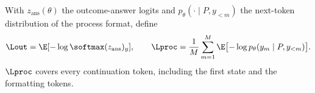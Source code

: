 \begin{definition}\label{def:losses}
With $z_{\mathrm{ans}}(\theta)$ the outcome-answer logits and $p_\theta(\cdot\mid P,y_{<m})$ the next-token distribution of the process format, define
\begin{equation}\label{eq:objectives}
\Lout=\E[-\log\softmax(z_{\mathrm{ans}})_y],\qquad
\Lproc=\frac1M\sum_{m=1}^M\E\bigl[-\log p_\theta(y_m\mid P,y_{<m})\bigr].
\end{equation}
$\Lproc$ covers every continuation token, including the first state and the formatting tokens.
\end{definition}

